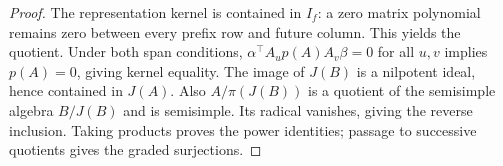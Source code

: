 \begin{proof}
The representation kernel is contained in $I_f$: a zero matrix polynomial remains zero between every prefix row and future column. This yields the quotient. Under both span conditions, $\alpha^\top A_u p(A)A_v\beta=0$ for all $u,v$ implies $p(A)=0$, giving kernel equality. The image of $J(B)$ is a nilpotent ideal, hence contained in $J(A)$. Also $A/\pi(J(B))$ is a quotient of the semisimple algebra $B/J(B)$ and is semisimple. Its radical vanishes, giving the reverse inclusion. Taking products proves the power identities; passage to successive quotients gives the graded surjections.
\end{proof}
